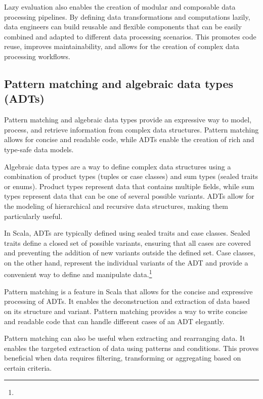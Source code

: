 Lazy evaluation also enables the creation of modular and composable data processing pipelines. By defining data transformations and computations lazily, data engineers can build reusable and flexible components that can be easily combined and adapted to different data processing scenarios. This promotes code reuse, improves maintainability, and allows for the creation of complex data processing workflows.\footnotemark[13]



\subsection{Pattern matching and algebraic data types (ADTs)}

Pattern matching and algebraic data types provide an expressive way to model, process, and retrieve information from complex data structures. Pattern matching allows for concise and readable code, while ADTs enable the creation of rich and type-safe data models.\footnotemark[14]

Algebraic data types are a way to define complex data structures using a combination of product types (tuples or case classes) and sum types (sealed traits or enums). Product types represent data that contains multiple fields, while sum types represent data that can be one of several possible variants. ADTs allow for the modeling of hierarchical and recursive data structures, making them particularly useful.\footnotemark[14]

In Scala, ADTs are typically defined using sealed traits and case classes. Sealed traits define a closed set of possible variants, ensuring that all cases are covered and preventing the addition of new variants outside the defined set. Case classes, on the other hand, represent the individual variants of the ADT and provide a convenient way to define and manipulate data.\footnote[14]{}



Pattern matching is a feature in Scala that allows for the concise and expressive processing of ADTs. It enables the deconstruction and extraction of data based on its structure and variant. Pattern matching provides a way to write concise and readable code that can handle different cases of an ADT elegantly.\footnotemark[14]



Pattern matching can also be useful when extracting and rearranging data. It enables the targeted extraction of data using patterns and conditions. This proves beneficial when data requires filtering, transforming or aggregating based on certain criteria.\footnotemark[14]

